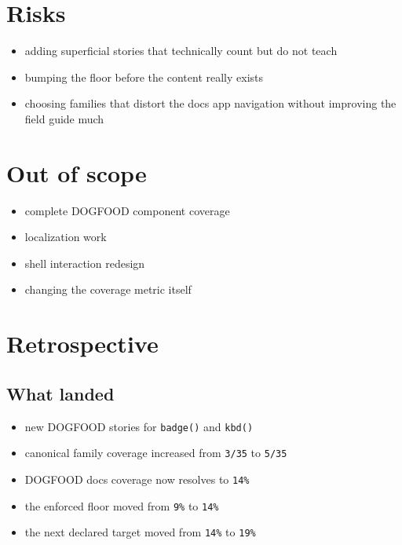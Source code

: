 \section{Risks}\label{record-066-risks}

\begin{itemize}
\tightlist
\item
  adding superficial stories that technically count but do not teach
\item
  bumping the floor before the content really exists
\item
  choosing families that distort the docs app navigation without improving the field guide much
\end{itemize}

\section{Out of scope}\label{record-066-out-of-scope}

\begin{itemize}
\tightlist
\item
  complete DOGFOOD component coverage
\item
  localization work
\item
  shell interaction redesign
\item
  changing the coverage metric itself
\end{itemize}

\section{Retrospective}\label{record-066-retrospective}

\subsection{What landed}\label{record-066-what-landed}

\begin{itemize}
\tightlist
\item
  new DOGFOOD stories for \texttt{b\allowbreak{}a\allowbreak{}d\allowbreak{}g\allowbreak{}e\allowbreak{}(\allowbreak{})} and \texttt{k\allowbreak{}b\allowbreak{}d\allowbreak{}(\allowbreak{})}
\item
  canonical family coverage increased from \texttt{3\allowbreak{}/\allowbreak{}3\allowbreak{}5} to \texttt{5\allowbreak{}/\allowbreak{}3\allowbreak{}5}
\item
  DOGFOOD docs coverage now resolves to \texttt{1\allowbreak{}4\allowbreak{}\%}
\item
  the enforced floor moved from \texttt{9\allowbreak{}\%} to \texttt{1\allowbreak{}4\allowbreak{}\%}
\item
  the next declared target moved from \texttt{1\allowbreak{}4\allowbreak{}\%} to \texttt{1\allowbreak{}9\allowbreak{}\%}
\end{itemize}

